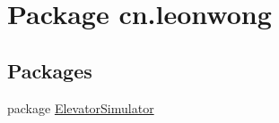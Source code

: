 \hypertarget{namespacecn_1_1leonwong}{}\section{Package cn.\+leonwong}
\label{namespacecn_1_1leonwong}
\subsection*{Packages}
\begin{DoxyCompactItemize}
\item 
package \hyperlink{namespacecn_1_1leonwong_1_1_elevator_simulator}{Elevator\+Simulator}
\end{DoxyCompactItemize}
